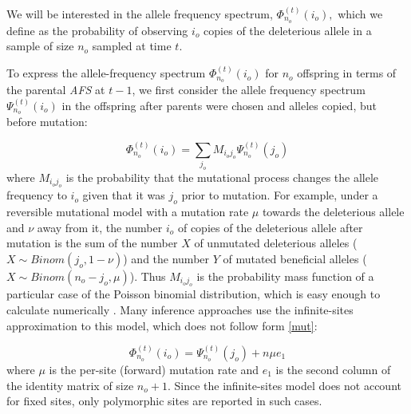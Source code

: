 \documentclass[9pt,twocolumn,twoside,lineno]{gsajnl}
\newcommand{\afs}[2]{\Phi_{#1}^{(#2)}}
\newcommand{\afsPsi}[2]{\Psi_{#1}^{(#2)}}
\newcommand{\sgcomment}[1]{\textcolor{blue}{SG: #1}}
\begin{document}

We will be interested in the allele frequency spectrum, $\afs{n_o}{t}(i_o),$ which we
define as the probability of observing $i_o$ copies of the deleterious allele in a sample of size $n_o$ sampled at time $t$. 


To express the allele-frequency spectrum $\afs{n_o}{t}(i_o)$ for $n_o$ offspring in terms of the parental \textit{AFS} at $t-1$, we first consider the allele frequency spectrum  $\afsPsi{n_o}{t}(i_o)$ in the offspring after parents were chosen and alleles copied, but before mutation:   

\begin{equation}
  \afs{n_o}{t}(i_o)=  \sum_{j_o} M_{i_oj_o} \afsPsi{n_o}{t}(j_o) 
  \label{mut}
\end{equation}
where $M_{i_oj_o}$ is the probability that the mutational process changes the allele frequency to $i_o$ given that it was $j_o$ prior to mutation. For example, under a reversible mutational model with a mutation rate $\mu$ towards the deleterious allele and $\nu$ away from it, the number $i_o$ of copies of the deleterious allele after mutation is the sum of the number $X$ of unmutated deleterious alleles ($X \sim \mathit{Binom}(j_o, 1-\nu)$)  and the number $Y$ of mutated beneficial alleles  ($X \sim \mathit{Binom}(n_o-j_o, \mu)$). Thus $M_{i_oj_o}$ is the probability mass function of a particular case of the Poisson binomial distribution, which is easy enough to calculate numerically \cite{}. Many inference approaches use the infinite-sites approximation to this model, which does not follow form \eqref{mut}:  

\begin{equation}
  \afs{n_o}{t}(i_o)=  \afsPsi{n_o}{t}(j_o) + n \mu e_1
\end{equation}
where $\mu$ is the per-site (forward) mutation rate and $e_1$ is the second column of the identity
matrix of size $n_o+1.$ Since the infinite-sites model does not account for fixed sites,
only polymorphic sites are reported in such cases. 
\end{document}
